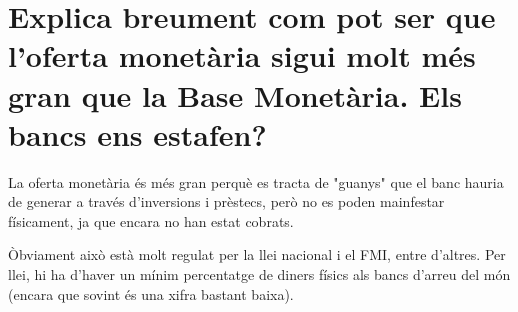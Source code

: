 \section {
  Explica breument com pot ser que l’oferta monetària sigui molt més
  gran que la Base Monetària. Els bancs ens estafen?
}

La oferta monetària és més gran perquè es tracta de "guanys" que el banc
hauria de generar a través d'inversions i prèstecs, però no es poden
mainfestar físicament, ja que encara no han estat cobrats. 

Òbviament això està molt regulat per la llei nacional i el FMI, entre
d'altres. Per llei, hi ha d'haver un mínim percentatge de diners físics
als bancs d'arreu del món (encara que sovint és una xifra bastant baixa).
